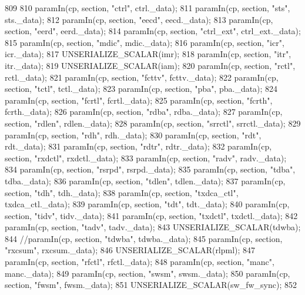 \begin{DoxyCode}
809     {
810         paramIn(cp, section, "ctrl", ctrl._data);
811         paramIn(cp, section, "sts", sts._data);
812         paramIn(cp, section, "eecd", eecd._data);
813         paramIn(cp, section, "eerd", eerd._data);
814         paramIn(cp, section, "ctrl_ext", ctrl_ext._data);
815         paramIn(cp, section, "mdic", mdic._data);
816         paramIn(cp, section, "icr", icr._data);
817         UNSERIALIZE_SCALAR(imr);
818         paramIn(cp, section, "itr", itr._data);
819         UNSERIALIZE_SCALAR(iam);
820         paramIn(cp, section, "rctl", rctl._data);
821         paramIn(cp, section, "fcttv", fcttv._data);
822         paramIn(cp, section, "tctl", tctl._data);
823         paramIn(cp, section, "pba", pba._data);
824         paramIn(cp, section, "fcrtl", fcrtl._data);
825         paramIn(cp, section, "fcrth", fcrth._data);
826         paramIn(cp, section, "rdba", rdba._data);
827         paramIn(cp, section, "rdlen", rdlen._data);
828         paramIn(cp, section, "srrctl", srrctl._data);
829         paramIn(cp, section, "rdh", rdh._data);
830         paramIn(cp, section, "rdt", rdt._data);
831         paramIn(cp, section, "rdtr", rdtr._data);
832         paramIn(cp, section, "rxdctl", rxdctl._data);
833         paramIn(cp, section, "radv", radv._data);
834         paramIn(cp, section, "rsrpd", rsrpd._data);
835         paramIn(cp, section, "tdba", tdba._data);
836         paramIn(cp, section, "tdlen", tdlen._data);
837         paramIn(cp, section, "tdh", tdh._data);
838         paramIn(cp, section, "txdca_ctl", txdca_ctl._data);
839         paramIn(cp, section, "tdt", tdt._data);
840         paramIn(cp, section, "tidv", tidv._data);
841         paramIn(cp, section, "txdctl", txdctl._data);
842         paramIn(cp, section, "tadv", tadv._data);
843         UNSERIALIZE_SCALAR(tdwba);
844         //paramIn(cp, section, "tdwba", tdwba._data);
845         paramIn(cp, section, "rxcsum", rxcsum._data);
846         UNSERIALIZE_SCALAR(rlpml);
847         paramIn(cp, section, "rfctl", rfctl._data);
848         paramIn(cp, section, "manc", manc._data);
849         paramIn(cp, section, "swsm", swsm._data);
850         paramIn(cp, section, "fwsm", fwsm._data);
851         UNSERIALIZE_SCALAR(sw_fw_sync);
852     }
\end{DoxyCode}



